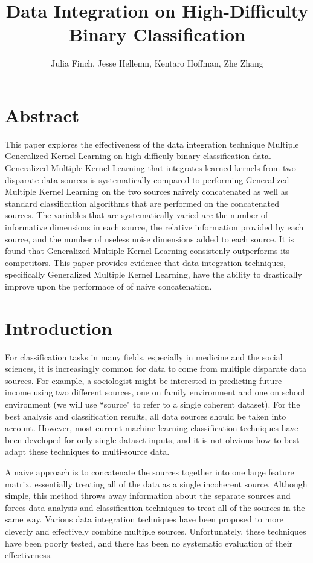 \documentclass{article}
\begin{document}
\title{Data Integration on High-Difficulty Binary Classification}
\author{Julia Finch, Jesse Hellemn, Kentaro Hoffman, Zhe Zhang}
\maketitle


\section*{Abstract}

This paper explores the effectiveness of the data integration technique Multiple Generalized Kernel Learning on high-difficuly binary classification data. Generalized Multiple Kernel Learning that integrates learned kernels from two disparate data sources is systematically compared to performing Generalized Multiple Kernel Learning on the two sources naively concatenated as well as standard classification algorithms that are performed on the concatenated sources. The variables that are systematically varied are the number of informative dimensions in each source, the relative information provided by each source, and the number of useless noise dimensions added to each source. It is found that Generalized Multiple Kernel Learning consistenly outperforms its competitors. This paper provides evidence that data integration techniques, specifically Generalized Multiple Kernel Learning, have the ability to drastically improve upon the performace of of naive concatenation.

\section*{Introduction}
For classification tasks in many fields, especially in medicine and the social
sciences, it is increasingly common for data to come from multiple disparate
data sources. For example, a sociologist might be interested in predicting
future income using two different sources, one on family environment and one on
school environment (we will use ``source" to refer to a single coherent
dataset). For the best analysis and classification results, all data sources
should be taken into account. However, most current machine learning
classification techniques have been developed for only single dataset inputs,
and it is not obvious how to best adapt these techniques to multi-source data.

A naive approach is to concatenate the sources together into one large feature
matrix, essentially treating all of the data as a single incoherent source.
Although simple, this method throws away
information about the separate sources and forces data analysis and
classification techniques to treat all of the sources in the same way. Various
data integration techniques have been proposed to more cleverly and effectively
combine multiple sources. Unfortunately, these techniques have been poorly
tested, and there has been no systematic evaluation of their effectiveness.
\end{document}
